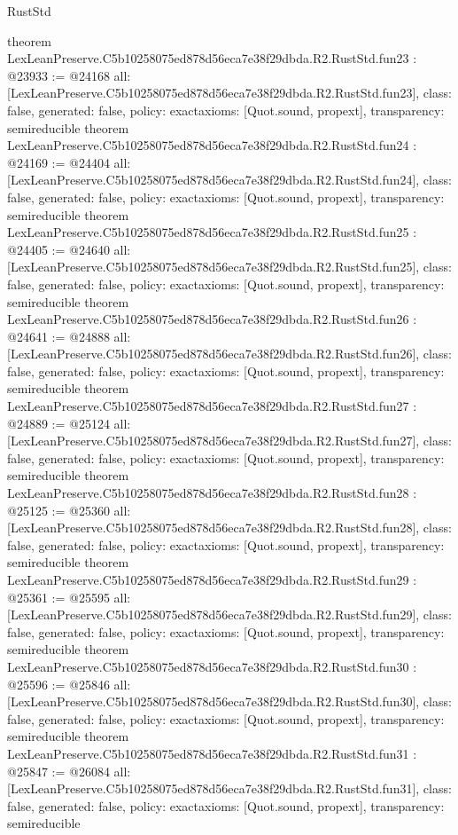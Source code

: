 \begin{lexlean}{RustStd}
\begin{coremodule}
{}
theorem LexLeanPreserve.C5b10258075ed878d56eca7e38f29dbda.R2.RustStd.fun23 : @23933 := @24168 {
  all: [LexLeanPreserve.C5b10258075ed878d56eca7e38f29dbda.R2.RustStd.fun23],
  class: false,
  generated: false,
  policy: exact{axioms: [Quot.sound, propext]},
  transparency: semireducible
}
theorem LexLeanPreserve.C5b10258075ed878d56eca7e38f29dbda.R2.RustStd.fun24 : @24169 := @24404 {
  all: [LexLeanPreserve.C5b10258075ed878d56eca7e38f29dbda.R2.RustStd.fun24],
  class: false,
  generated: false,
  policy: exact{axioms: [Quot.sound, propext]},
  transparency: semireducible
}
theorem LexLeanPreserve.C5b10258075ed878d56eca7e38f29dbda.R2.RustStd.fun25 : @24405 := @24640 {
  all: [LexLeanPreserve.C5b10258075ed878d56eca7e38f29dbda.R2.RustStd.fun25],
  class: false,
  generated: false,
  policy: exact{axioms: [Quot.sound, propext]},
  transparency: semireducible
}
theorem LexLeanPreserve.C5b10258075ed878d56eca7e38f29dbda.R2.RustStd.fun26 : @24641 := @24888 {
  all: [LexLeanPreserve.C5b10258075ed878d56eca7e38f29dbda.R2.RustStd.fun26],
  class: false,
  generated: false,
  policy: exact{axioms: [Quot.sound, propext]},
  transparency: semireducible
}
theorem LexLeanPreserve.C5b10258075ed878d56eca7e38f29dbda.R2.RustStd.fun27 : @24889 := @25124 {
  all: [LexLeanPreserve.C5b10258075ed878d56eca7e38f29dbda.R2.RustStd.fun27],
  class: false,
  generated: false,
  policy: exact{axioms: [Quot.sound, propext]},
  transparency: semireducible
}
theorem LexLeanPreserve.C5b10258075ed878d56eca7e38f29dbda.R2.RustStd.fun28 : @25125 := @25360 {
  all: [LexLeanPreserve.C5b10258075ed878d56eca7e38f29dbda.R2.RustStd.fun28],
  class: false,
  generated: false,
  policy: exact{axioms: [Quot.sound, propext]},
  transparency: semireducible
}
theorem LexLeanPreserve.C5b10258075ed878d56eca7e38f29dbda.R2.RustStd.fun29 : @25361 := @25595 {
  all: [LexLeanPreserve.C5b10258075ed878d56eca7e38f29dbda.R2.RustStd.fun29],
  class: false,
  generated: false,
  policy: exact{axioms: [Quot.sound, propext]},
  transparency: semireducible
}
theorem LexLeanPreserve.C5b10258075ed878d56eca7e38f29dbda.R2.RustStd.fun30 : @25596 := @25846 {
  all: [LexLeanPreserve.C5b10258075ed878d56eca7e38f29dbda.R2.RustStd.fun30],
  class: false,
  generated: false,
  policy: exact{axioms: [Quot.sound, propext]},
  transparency: semireducible
}
theorem LexLeanPreserve.C5b10258075ed878d56eca7e38f29dbda.R2.RustStd.fun31 : @25847 := @26084 {
  all: [LexLeanPreserve.C5b10258075ed878d56eca7e38f29dbda.R2.RustStd.fun31],
  class: false,
  generated: false,
  policy: exact{axioms: [Quot.sound, propext]},
  transparency: semireducible
}
\end{coremodule}
\end{lexlean}
